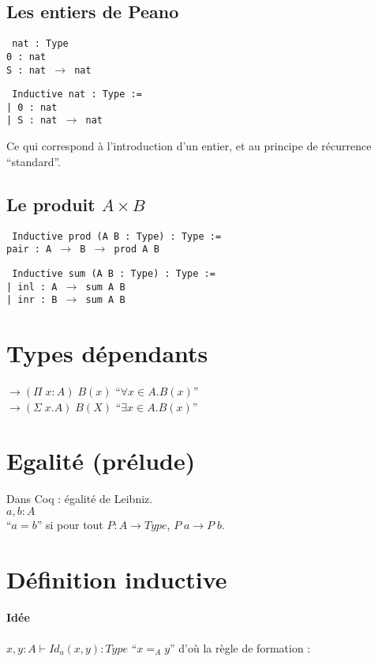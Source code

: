 \documentclass{article}
\begin{document}
\subsection{Les entiers de Peano}
\texttt{
nat : Type\\
0 : nat\\
S : nat $\to$ nat
}
\bigskip

\texttt{
Inductive nat : Type :=\\
| 0 : nat\\
| S : nat $\to$ nat}
\bigskip

Ce qui correspond à l'introduction d'un entier, et au principe de récurrence ``standard''.




\subsection{Le produit $A\times B$}
\texttt{
Inductive prod (A B : Type) : Type :=\\
pair : A $\to$ B $\to$ prod A B\\
}
\bigskip

\texttt{
Inductive sum (A B : Type) : Type :=\\
| inl : A $\to$ sum A B\\
| inr : B $\to$ sum A B
}

\section{Types dépendants}
$\to (\Pi\; x : A)\; B(x)$ ``$\forall x\in A. B(x)$''\\
$ \to (\Sigma \; x.A)\; B(X)$ ``$\exists x\in A . B(x)$''

\section{Egalité (prélude)}
Dans Coq : égalité de Leibniz.\\
$a, b : A$\\
``$a=b$'' si pour tout $P: A \to Type$, $P\; a \to P \; b$.

\section{Définition inductive}
\paragraph{Idée}
$x,y : A \vdash Id_a (x,y) : Type$ ``$x=_A y$''
d'où la règle de formation :
\begin{multicols}{2}
\begin{prooftree}
\end{prooftree}

\begin{prooftree}
\end{prooftree}
\end{multicols}
\end{document}
